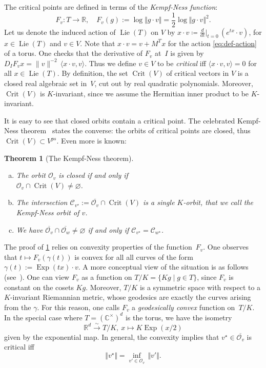 \documentclass[10pt,a4paper]{article}
\newtheorem{theorem}{Theorem}[section]
\theoremstyle{definition}
\newenvironment{alphaenumerate}{\begin{enumerate}[(a)]}{\end{enumerate}}
\DeclareMathOperator{\Exp}{Exp}
\DeclareMathOperator{\Lie}{Lie}
\DeclareMathOperator{\Crit}{Crit}
\newcommand{\CC}{\mathbb{C}}
\newcommand{\RR}{\mathbb{R}}
\newcommand{\OO}{\ensuremath{\mathcal{O}}}
\newcommand{\KK}{\ensuremath{\mathcal{C}}}
\numberwithin{equation}{section}
\begin{document}
The critical points are defined in terms of the \textit{Kempf-Ness function}:
\begin{equation}\label{eq:kn-function}
    F_v\colon T \rightarrow \RR, \quad F_v(g) := \log\Vert g \cdot v\Vert = \frac12 \log\Vert g \cdot v\Vert^2.
\end{equation}
Let us denote the induced action of $\Lie(T)$ on $V$
by  $x\cdot v \coloneqq \frac{d}{dt}\big |_{t=0} \, (e^{tx}\cdot v)$,
for $x\in\Lie(T)$ and $v\in V$.
Note that $x\cdot v = v + M^T x$
for the action \cref{eq:def-action} of a torus.
One checks that the derivative of $F_v$ at~$I$ is given by
$D_I F_v x = \|v\|^{-2}\, \langle x\cdot v, v\rangle$.
Thus we define $v\in V$ to be \textit{critical} iff
$\langle x\cdot v, v\rangle = 0$ for all $x\in\Lie(T)$.
By definition, the set $\Crit(V)$ of critical vectors in $V$ is a closed real algebraic set in~$V$,
cut out by real quadratic polynomials.
Moreover, $\Crit(V)$ is $K$-invariant,
since we assume the Hermitian inner product to be $K$-invariant.

It is easy to see that closed orbits contain a critical point.
The celebrated Kempf-Ness theorem~\cite{kempfness} states
the converse: the orbits of critical points are closed, thus
$\Crit(V)\subset V^{ps}$.
Even more is known:

\begin{theorem}[The Kempf-Ness theorem]\label{thm:kempf-ness}
\begin{alphaenumerate}
\item The orbit $\OO_v$ is closed if and only if \\$\OO_v\cap \Crit(V)\neq\varnothing$.
\item The intersection $\KK_{v^\star}:=\overline{\OO_v}\cap\Crit(V)$ is a single $K$-orbit,
 that we call the \textit{Kempf-Ness orbit} of $v$.
\item %
 We have $\overline{\OO_v}\cap\overline{\OO_w}\neq\varnothing$ if and only if $\KK_{v^\star}=\KK_{w^\star}$.
\end{alphaenumerate}
\end{theorem}

The proof of \cref{thm:kempf-ness} relies on convexity properties of the function~$F_v$.
One observes that $t\mapsto F_v(\gamma(t))$ is convex for all all curves of the form
$\gamma(t):= \Exp(tx) \cdot v$.
A more conceptual view of the situation is as follows (see~\cite{BFGOWW2}).
One can view $F_v$ as a function on $T/K =\{ Kg \mid g \in T \}$,
since $F_v$ is constant on the cosets $Kg$.
Moreover, $T/K$ is a symmetric space with respect to a $K$-invariant
Riemannian metric, whose geodesics are exactly the curves arising from the $\gamma$.
For this reason, one calls $F_v$ a \textit{geodesically convex} function on~$T/K$.
In the special case where $T=(\CC^\times)^d$ is the torus, we have the isometry
\begin{equation}\label{eq:exp-par}
 \RR^d \stackrel{\sim}{\longrightarrow} T/K, \ x\mapsto K \Exp(x/2)
\end{equation}
given by the exponential map.
In general, the convexity implies that $v^\star\in\overline{\OO_v}$ is critical iff
\[
\Vert v^\star\Vert = \inf_{v'\in\OO_v} \, \Vert v'\Vert.
\]
\end{document}
